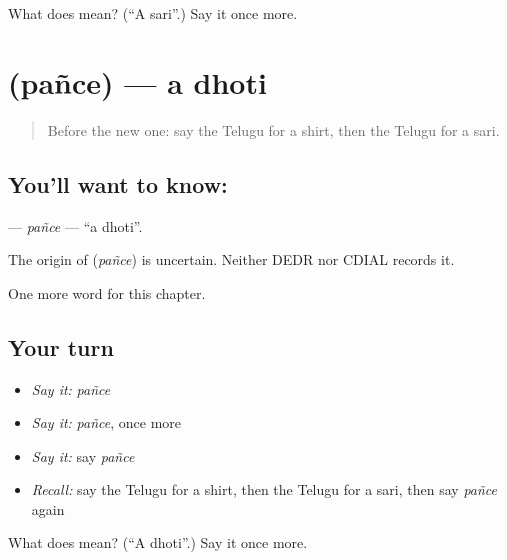 \begin{tcolorbox}[breakable,colback=teal!4,colframe=teal!35!black,title={Before you move on}]
What does  mean? (\textquotedblleft{}A sari\textquotedblright{}.) Say it once more.
\end{tcolorbox}
\section[\texorpdfstring{\te{పంచె} (pañce)}{పంచె (pañce)}]{ (pañce) — a dhoti}

\label{lesson:TE-C114-pance}



\begin{quote}
Before the new one: say the Telugu for a shirt, then the Telugu for a sari.
\end{quote}

\subsection*{You'll want to know: }
\textbf{} — \emph{pañce} — \textquotedblleft{}a dhoti\textquotedblright{}.

\begin{cousinweb}
The origin of \textbf{} (\emph{pañce}) is uncertain. Neither DEDR nor CDIAL records it.
\end{cousinweb}

\begin{grammarlens}[title={What you've built}]
One more word for this chapter.
\end{grammarlens}

\subsection*{Your turn}
\begin{itemize}
\raggedright
  \item \emph{Say it:} \emph{pañce}
  \item \emph{Say it:} \emph{pañce}, once more
  \item \emph{Say it:} say \emph{pañce}
  \item \emph{Recall:} say the Telugu for a shirt, then the Telugu for a sari, then say \emph{pañce} again
\end{itemize}

\begin{tcolorbox}[breakable,colback=teal!4,colframe=teal!35!black,title={Before you move on}]
What does  mean? (\textquotedblleft{}A dhoti\textquotedblright{}.) Say it once more.
\end{tcolorbox}
